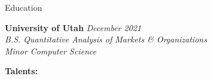 \documentclass{resume/resume}
\begin{document}
\begin{rSection}{Education}

{\bf University of Utah} \hfill {\em December 2021}
\vspace{2pt}
\emph{
    \\ B.S. Quantitative Analysis of Markets \& Organizations
    \\ Minor Computer Science
}

%
%
%
%
%
%
%   
%
%
%
%

%
%
{\bf Talents:}
\vspace{-1.83em}


\end{rSection}
\end{document}
